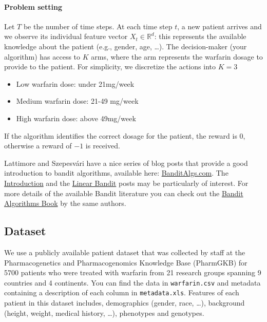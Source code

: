 \documentclass[11pt]{article}
\begin{document}
\paragraph{Problem setting} 

Let $T$ be the number of time steps. At each time step $t$, a new patient arrives and we 
observe its individual feature vector $X_t \in \mathbb{R}^d$: this represents the available knowledge about the patient (e.g., gender, age, \dots).  The decision-maker (your algorithm) has access to $K$ arms, where the arm represents the warfarin dosage to provide to the patient. 
For simplicity, we discretize the actions into $K=3$
\begin{itemize}
    \item Low warfarin dose: under 21mg/week
    \item Medium warfarin dose: 21-49 mg/week
    \item High warfarin dose: above 49mg/week
\end{itemize}
If the algorithm identifies the correct dosage for the patient, the reward is 0, otherwise a reward of $-1$ is received.


\noindent Lattimore and Szepesvári have a nice series of blog posts that provide a good introduction to bandit algorithms, available here:  \href{/http://banditalgs.com}{BanditAlgs.com}. The \href{http://banditalgs.com/2016/09/04/bandits-a-new-beginning/}{Introduction} and the \href{http://banditalgs.com/2016/10/19/stochastic-linear-bandits/}{Linear Bandit} posts may be particularly of interest. For more details of the available Bandit literature you can check out the \href{https://tor-lattimore.com/downloads/book/book.pdf}{Bandit Algorithms Book} by the same authors.


\subsection{Dataset}\label{sec:data}

We use a publicly available patient dataset that was collected by staff at the Pharmacogenetics and Pharmacogenomics Knowledge Base (PharmGKB) for 5700 patients who were treated with warfarin from 21 research groups spanning 9 countries and 4 continents. You can find the data in \texttt{warfarin.csv} and metadata containing a description of each column in \texttt{metadata.xls}. Features of each patient in this dataset includes, demographics (gender, race, \dots), background (height, weight, medical history, \dots), phenotypes and genotypes. 
\end{document}
